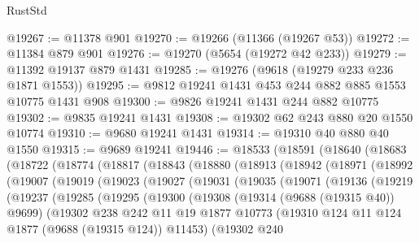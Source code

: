 \begin{lexlean}{RustStd}
\begin{coremodule}
@19267 := @11378 @901
@19270 := @19266 (@11366 (@19267 @53))
@19272 := @11384 @879 @901
@19276 := @19270 (@5654 (@19272 @42 @233))
@19279 := @11392 @19137 @879 @1431
@19285 := @19276 (@9618 (@19279 @233 @236 @1871 @1553))
@19295 := @9812 @19241 @1431 @453 @244 @882 @885 @1553 @10775 @1431 @908
@19300 := @9826 @19241 @1431 @244 @882 @10775
@19302 := @9835 @19241 @1431
@19308 := @19302 @62 @243 @880 @20 @1550 @10774
@19310 := @9680 @19241 @1431
@19314 := @19310 @40 @880 @40 @1550
@19315 := @9689 @19241
@19446 := @18533
    (@18591
      (@18640
        (@18683
          (@18722
            (@18774
              (@18817
                (@18843
                  (@18880
                    (@18913
                      (@18942
                        (@18971
                          (@18992
                            (@19007
                              (@19019
                                (@19023
                                  (@19027
                                    (@19031
                                      (@19035
                                        (@19071
                                          (@19136
                                            (@19219
                                              (@19237
                                                (@19285
                                                  (@19295
                                                    (@19300
                                                      (@19308
                                                        (@19314 (@9688 (@19315 @40)) @9699)
                                                        (@19302
                                                          @238
                                                          @242
                                                          @11
                                                          @19
                                                          @1877
                                                          @10773
                                                          (@19310
                                                            @124
                                                            @11
                                                            @124
                                                            @1877
                                                            (@9688 (@19315 @124))
                                                            @11453)
                                                          (@19302
                                                            @240

\end{coremodule}
\end{lexlean}
